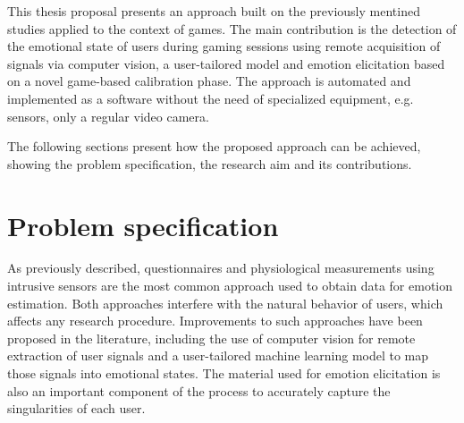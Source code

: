 This thesis proposal presents an approach built on the previously mentined studies applied to the context of games. The main contribution is the detection of the emotional state of users during gaming sessions using remote acquisition of signals via computer vision, a user-tailored model and emotion elicitation based on a novel game-based calibration phase. The approach is automated and implemented as a software without the need of specialized equipment, e.g. sensors, only a regular video camera.


The following sections present how the proposed approach can be achieved, showing the problem specification, the research aim and its contributions.

\section{Problem specification}

As previously described, questionnaires and physiological measurements using intrusive sensors are the most common approach used to obtain data for emotion estimation. Both approaches interfere with the natural behavior of users, which affects any research procedure. Improvements to such approaches have been proposed in the literature, including the use of computer vision for remote extraction of user signals and a user-tailored machine learning model to map those signals into emotional states. The material used for emotion elicitation is also an important component of the process to accurately capture the singularities of each user.

